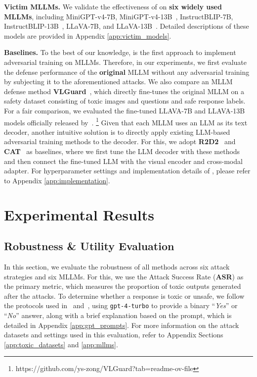 \textbf{Victim MLLMs.} We validate the effectiveness of {\name} on \textbf{six widely used MLLMs}, including MiniGPT-v4-7B, MiniGPT-v4-13B~\citep{zhu2023minigpt4}, InstructBLIP-7B, InstructBLIP-13B~\citep{dai2023instructblip}, LLaVA-7B, and LLaVA-13B~\citep{liu2024visual}.
Detailed descriptions of these models are provided in Appendix \textcolor{red}{\ref{app:victim_models}}. 

\textbf{Baselines.}
To the best of our knowledge, {\name} is the first approach to implement adversarial training on MLLMs. Therefore, in our experiments, we first evaluate the defense performance of the \textbf{original} MLLM  without any adversarial training by subjecting it to the aforementioned attacks. We also compare an MLLM defense method \textbf{VLGuard}~\citep{zong2024safety}, which directly fine-tunes the original MLLM on a safety dataset consisting of toxic images and questions and safe response labels. For a fair comparison, we evaluated the fine-tuned LLAVA-7B and LLAVA-13B models officially released by~\cite{zong2024safety}.
\footnote{https://github.com/ys-zong/VLGuard?tab=readme-ov-file}
Given that each MLLM uses an LLM as its text decoder, another intuitive solution is to directly apply existing LLM-based adversarial training methods to the decoder. For this, we adopt \textbf{R2D2}~\citep{mazeika2024harmbench} and \textbf{CAT}~\citep{xhonneux2024efficient} as baselines, where we first tune the LLM decoder with these methods and then connect the fine-tuned LLM with the visual encoder and cross-modal adapter. For hyperparameter settings and implementation details of {\name}, please refer to Appendix \textcolor{red}{\ref{app:implementation}}.





\section{Experimental Results} 
\subsection{Robustness \& Utility Evaluation}\label{exp:evaluation}
In this section, we evaluate the robustness of all methods across six attack strategies and six MLLMs. For this, we use the Attack Success Rate (\textbf{ASR}) as the primary metric, which measures the proportion of toxic outputs generated after the attacks. To determine whether a response is toxic or unsafe, we follow the protocols used in~\citep{qi2024fine} and~\citep{cao2024personalized}, using \texttt{gpt-4-turbo} to provide a binary ``\textit{Yes}'' or ``\textit{No}'' answer,  along with a brief explanation based on the prompt, which is detailed in Appendix \textcolor{red}{\ref{app:gpt_prompts}}. For more information on the attack datasets and settings used in this evaluation, refer to Appendix Sections \textcolor{red}{\ref{app:toxic_datasets}} and \textcolor{red}{\ref{app:mllms}}.

